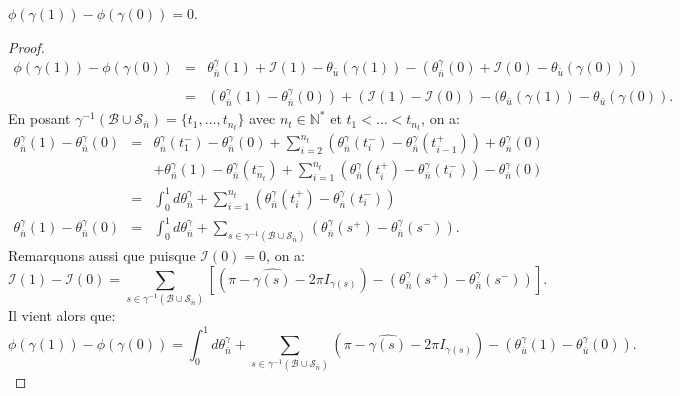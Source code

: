 \begin{lemma}
    \label{lem:marvelous_lemma}
    $\phi(\gamma(1))-\phi(\gamma(0))=0$.
\end{lemma}
\begin{proof}
    $$
    \begin{array}{lcl}
        \phi(\gamma(1))-\phi(\gamma(0))&=&\theta^\gamma_{\bar{n}}(1)+\mathcal{I}(1)-\theta_{\bar{u}}(\gamma(1))-(\theta^\gamma_{\bar{n}}(0)+\mathcal{I}(0)-\theta_{\bar{u}}(\gamma(0)))\\\\
        &=&(\theta^\gamma_{\bar{n}}(1)-\theta_{\bar{n}}^\gamma(0))+(\mathcal{I}(1)-\mathcal{I}(0))-(\theta_{\bar{u}}(\gamma(1))-\theta_{\bar{u}}(\gamma(0)).
    \end{array}
    $$
    En posant $\gamma^{-1}(\mathcal{B}\cup\mathcal{S}_{\bar{n}})=\{t_1,\dots,t_{n_t}\}$ avec $n_t\in\mathbb{N}^*$ et $t_1<\dots<t_{n_t}$, on a:
    $$
    \begin{array}{lcl}
        \theta_{\bar{n}}^\gamma(1)-\theta^\gamma_{\bar{n}}(0)&=&\theta_{\bar{n}}^\gamma(t_1^-)-\theta_{\bar{n}}^\gamma(0)+\displaystyle\sum_{i=2}^{n_t}\left(\theta_{\bar{n}}^\gamma(t_i^-)-\theta_{\bar{n}}^\gamma(t_{i-1}^+)\right)+\theta_{\bar{n}}^\gamma(0)\\[0.7cm]
        &&+\theta_{\bar{n}}^\gamma(1)-\theta_{\bar{n}}^\gamma(t_{n_t}^-)+\displaystyle\sum_{i=1}^{n_t}\left(\theta_{\bar{n}}^\gamma(t_i^+)-\theta_{\bar{n}}^\gamma(t_i^-)\right)-\theta_{\bar{n}}^\gamma(0)\\[0.7cm]
        &=&\displaystyle\int_0^1d\theta_{\bar{n}}^\gamma+\displaystyle\sum_{i=1}^{n_t}\left(\theta_{\bar{n}}^\gamma(t_i^+)-\theta_{\bar{n}}^\gamma(t_i^-)\right)\\[0.7cm]
        \theta_{\bar{n}}^\gamma(1)-\theta^\gamma_{\bar{n}}(0)&=&\displaystyle\int_0^1d\theta_{\bar{n}}^\gamma+\displaystyle\sum_{s\in\gamma^{-1}(\mathcal{B}\cup\mathcal{S}_{\bar{n}})}\left(\theta_{\bar{n}}^\gamma(s^+)-\theta_{\bar{n}}^\gamma(s^-)\right).
    \end{array}
    $$
    Remarquons aussi que puisque $\mathcal{I}(0)=0$, on a:
    $$
    \mathcal{I}(1)-\mathcal{I}(0)=\sum_{s\in\gamma^{-1}(\mathcal{B}\cup\mathcal{S}_{\bar{n}})}\left[\left(\pi-\widehat{\gamma(s)}-2\pi I_{\gamma(s)}\right)-\left(\theta^{\gamma}_{\bar{n}}(s^+)-\theta^{\gamma}_{\bar{n}}(s^-)\right)\right].
    $$
    Il vient alors que:
    $$
    \phi(\gamma(1))-\phi(\gamma(0))=\displaystyle\int_0^1d\theta_{\bar{n}}^\gamma+\sum_{s\in\gamma^{-1}(\mathcal{B}\cup\mathcal{S}_{\bar{n}})}\left(\pi-\widehat{\gamma(s)}-2\pi I_{\gamma(s)}\right)-(\theta_{\bar{u}}^\gamma(1)-\theta_{\bar{u}}^\gamma(0)).
$$
\end{proof}
